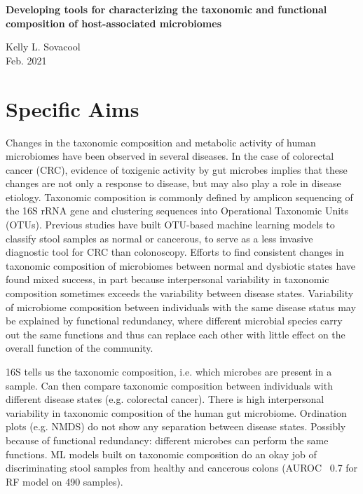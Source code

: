 \documentclass[11pt]{article}
\begin{document}
\sloppy
\begin{center}
\large{\textbf{
    Developing tools for characterizing the taxonomic and functional composition of host-associated microbiomes
}}

\vspace{11pt}

\small{
    Kelly L. Sovacool \\
    Feb. 2021
}
\end{center}

\section*{Specific Aims}

Changes in the taxonomic composition and metabolic activity of human microbiomes have been observed in several diseases.
In the case of colorectal cancer (CRC), evidence of toxigenic activity by gut microbes implies that these changes are not only a response to disease, but may also play a role in disease etiology.
Taxonomic composition is commonly defined by amplicon sequencing of the 16S rRNA gene and clustering sequences into Operational Taxonomic Units (OTUs).
Previous studies have built OTU-based machine learning models to classify stool samples as normal or cancerous, to serve as a less invasive diagnostic tool for CRC than colonoscopy.
Efforts to find consistent changes in taxonomic composition of microbiomes between normal and dysbiotic states have found mixed success, in part because interpersonal variability in taxonomic composition sometimes exceeds the variability between disease states.
Variability of microbiome composition between individuals with the same disease status may be explained by functional redundancy, where different microbial species carry out the same functions and thus can replace each other with little effect on the overall function of the community.

16S tells us the taxonomic composition, i.e. which microbes are present in a sample.
Can then compare taxonomic composition between individuals with different disease states (e.g. colorectal cancer).
There is high interpersonal variability in taxonomic composition of the human gut microbiome. Ordination plots (e.g. NMDS) do not show any separation between disease states. Possibly because of functional redundancy: different microbes can perform the same functions.
ML models built on taxonomic composition do an okay job of discriminating stool samples from healthy and cancerous colons (AUROC ~0.7 for RF model on 490 samples).
\end{document}
